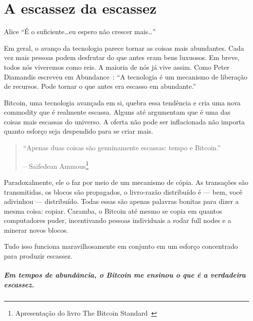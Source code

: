 
\chapter{A escassez da escassez}
\label{les:2}

\begin{chapquote}{Alice}
\enquote{É o suficiente\ldots eu espero não crescer mais\ldots}
\end{chapquote}

Em geral, o avanço da tecnologia parece tornar as coisas mais abundantes. Cada vez mais pessoas podem desfrutar do que antes eram bens luxuosos. Em breve, todos nós viveremos como reis. A maioria de nós já vive assim. Como Peter Diamandis escreveu em Abundance~\cite{abundance}: \enquote{A tecnologia é um mecanismo de liberação de recursos. Pode tornar o que antes era escasso em abundante.}

Bitcoin, uma tecnologia avançada em si, quebra essa tendência e cria uma nova commodity que é realmente escassa. Alguns até argumentam que é uma das coisas mais escassas do universo. A oferta não pode ser inflacionada não importa quanto esforço seja despendido para se criar mais.

\begin{quotation}\begin{samepage}
\enquote{Apenas duas coisas são genuinamente escassas: tempo e Bitcoin.}
\begin{flushright} -- Saifedean Ammous\footnote{Apresentação do livro The Bitcoin Standard~\cite{bitcoinstandard-pres}}
\end{flushright}\end{samepage}\end{quotation}

Paradoxalmente, ele o faz por meio de um mecanismo de cópia. As transações são transmitidas, os blocos são propagados, o livro-razão distribuído é --- bem, você adivinhou --- distribuído. Todas essas são apenas palavras bonitas para dizer a mesma coisa: copiar. Caramba, o Bitcoin até mesmo se copia em quantos computadores puder, incentivando pessoas individuais a rodar full nodes e a minerar novos blocos.

Tudo isso funciona maravilhosamente em conjunto em um esforço concentrado para produzir escassez.

\paragraph{Em tempos de abundância, o Bitcoin me ensinou o que é a verdadeira escassez.}

